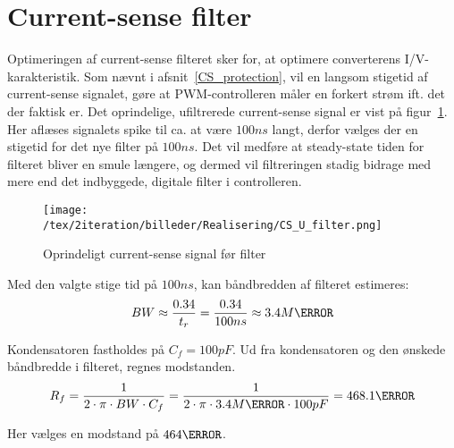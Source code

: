 
\section{Current-sense filter}
Optimeringen af current-sense filteret sker for, at optimere converterens I/V-karakteristik. Som nævnt i afsnit~\ref{CS_protection}, vil en langsom stigetid af current-sense signalet, gøre at PWM-controlleren måler en forkert strøm ift. det der faktisk er. Det oprindelige, ufiltrerede current-sense signal er vist på figur~\ref{fig:CS_U_filter}. Her aflæses signalets spike til ca. at være $100ns$ langt, derfor vælges der en stigetid for det nye filter på $100ns$. Det vil medføre at steady-state tiden for filteret bliver en smule længere, og dermed vil filtreringen stadig bidrage med mere end det indbyggede, digitale filter i controlleren.

\begin{figure}[H]
	\center
	\texttt{[image: /tex/2iteration/billeder/Realisering/CS\_U\_filter.png]}
	\caption{Oprindeligt current-sense signal før filter}
	\label{fig:CS_U_filter}
\end{figure}

\noindent Med den valgte stige tid på $100ns$, kan båndbredden af filteret estimeres:
\begin{equation} \label{filter_BW}
BW \approx \frac{0.34}{t_r} = \frac{0.34}{100ns} \approx 3.4M\hertz
\end{equation}

\noindent Kondensatoren fastholdes på $C_f=100pF$. Ud fra kondensatoren og den ønskede båndbredde i filteret, regnes modstanden.
\begin{equation} \label{filter_R}
R_f = \frac{1}{2 \cdot \pi \cdot BW \cdot C_f} = \frac{1}{2 \cdot \pi \cdot 3.4M\hertz \cdot 100pF} = 468.1\ohm
\end{equation}

\noindent Her vælges en modstand på $464\ohm$.




